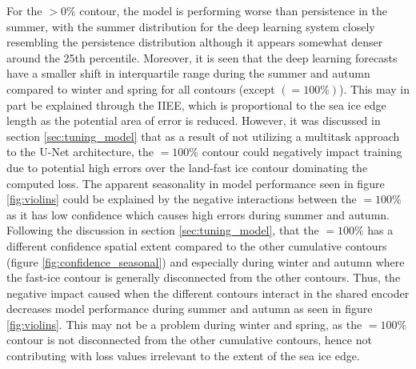 \documentclass[../main/thesis]{subfiles}
\begin{document}
For the $> 0\%$ contour, the model is performing worse than persistence in the summer, with the summer distribution for the deep learning system closely resembling the persistence distribution although it appears somewhat denser around the 25th percentile. Moreover, it is seen that the deep learning forecasts have a smaller shift in interquartile range during the summer and autumn compared to winter and spring for all contours (except $(=100\%)$). This may in part be explained through the IIEE, which is proportional to the sea ice edge length \cite{Goessling2016} as the potential area of error is reduced. However, it was discussed in section \ref{sec:tuning_model} that as a result of not utilizing a multitask approach to the U-Net architecture, the $=100\%$ contour could negatively impact training due to potential high errors over the land-fast ice contour dominating the computed loss. The apparent seasonality in model performance seen in figure \ref{fig:violins} could be explained by the negative interactions between the $=100\%$ as it has low confidence which causes high errors during summer and autumn. Following the discussion in section \ref{sec:tuning_model}, that the $=100\%$ has a different confidence spatial extent compared to the other cumulative contours (figure \ref{fig:confidence_seasonal}) and especially during winter and autumn where the fast-ice contour is generally disconnected from the other contours. Thus, the negative impact caused when the different contours interact in the shared encoder decreases model performance during summer and autumn as seen in figure \ref{fig:violins}. This may not be a problem during winter and spring, as the $=100\%$ contour is not disconnected from the other cumulative contours, hence not contributing with loss values irrelevant to the extent of the sea ice edge.
\end{document}

